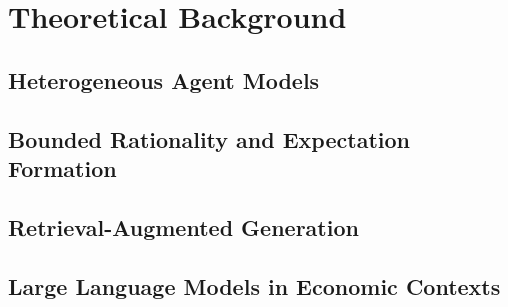 
\chapter{Theoretical Background}
\label{chap:theoretical_background}


\section{Heterogeneous Agent Models}
\label{sec:het_agent_models}


\section{Bounded Rationality and Expectation Formation}
\label{sec:bounded_rationality}


\section{Retrieval-Augmented Generation}
\label{sec:rag}


\section{Large Language Models in Economic Contexts}
\label{sec:llm_economics}


\endinput
